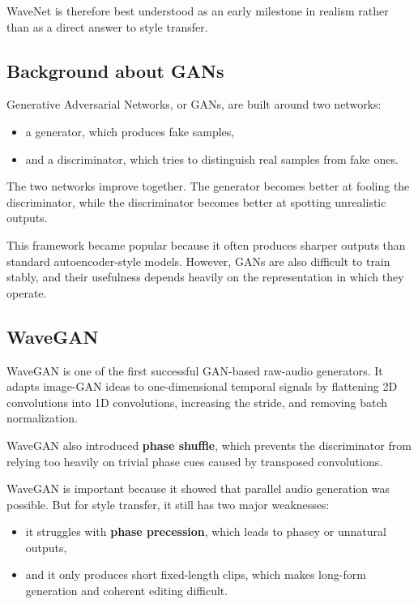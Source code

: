 \documentclass[11pt]{article}
\begin{document}
WaveNet is therefore best understood as an early milestone in realism rather than as a direct answer to style transfer.

\subsection{Background about GANs}

Generative Adversarial Networks, or GANs, are built around two networks:

\begin{itemize}
\item a generator, which produces fake samples,
\item and a discriminator, which tries to distinguish real samples from fake ones.
\end{itemize}

The two networks improve together. The generator becomes better at fooling the discriminator, while the discriminator becomes better at spotting unrealistic outputs.

This framework became popular because it often produces sharper outputs than standard autoencoder-style models. However, GANs are also difficult to train stably, and their usefulness depends heavily on the representation in which they operate.

\subsection{WaveGAN}

WaveGAN is one of the first successful GAN-based raw-audio generators. It adapts image-GAN ideas to one-dimensional temporal signals by flattening 2D convolutions into 1D convolutions, increasing the stride, and removing batch normalization.

WaveGAN also introduced \textbf{phase shuffle}, which prevents the discriminator from relying too heavily on trivial phase cues caused by transposed convolutions.

WaveGAN is important because it showed that parallel audio generation was possible. But for style transfer, it still has two major weaknesses:

\begin{itemize}
\item it struggles with \textbf{phase precession}, which leads to phasey or unnatural outputs,
\item and it only produces short fixed-length clips, which makes long-form generation and coherent editing difficult.
\end{itemize}
\end{document}
